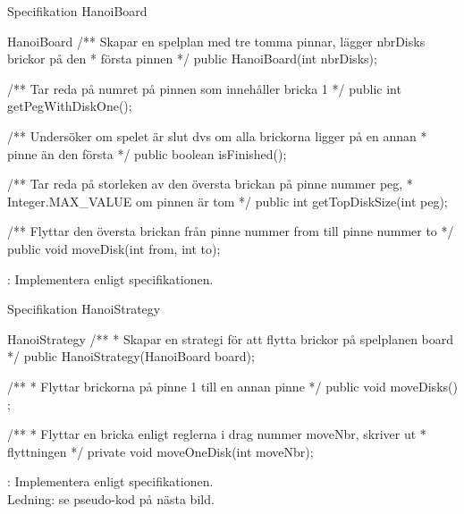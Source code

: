 \documentclass{lecturenotes}
\begin{document}
\begin{Slide}{Specifikation HanoiBoard }
\begin{ClassSpec}{HanoiBoard}
/** Skapar en spelplan med tre tomma pinnar, lägger nbrDisks brickor på den
 *  första pinnen
 */
public HanoiBoard(int nbrDisks);

/** Tar reda på numret på pinnen som innehåller bricka 1 */
public int getPegWithDiskOne(); 

/** Undersöker om spelet är slut dvs om alla brickorna ligger på en annan
 *  pinne än den första
 */
public boolean isFinished();  

/** Tar reda på storleken av den översta brickan på pinne nummer peg,
 *  Integer.MAX_VALUE om pinnen är tom
 */
public int getTopDiskSize(int peg);

/** Flyttar den översta brickan från pinne nummer from till pinne nummer to
 */
public void moveDisk(int from, int to);   
\end{ClassSpec}
: Implementera  enligt specifikationen.
\end{Slide} 

\begin{Slide}{Specifikation HanoiStrategy }
\begin{ClassSpec}{HanoiStrategy}
/**
 * Skapar en strategi för att flytta brickor på spelplanen board
 */
public HanoiStrategy(HanoiBoard board);

/**
 * Flyttar brickorna på pinne 1 till en annan pinne
 */
public void moveDisks() ;

/**
 * Flyttar en bricka enligt reglerna i drag nummer moveNbr, skriver ut
 * flyttningen
 */
private void moveOneDisk(int moveNbr);
\end{ClassSpec}
: Implementera  enligt specifikationen. \\ Ledning: se pseudo-kod på nästa bild.
\end{Slide} 
\end{document}
